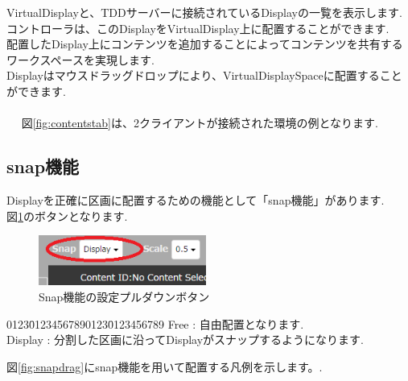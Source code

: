 \documentclass[a4paper,10pt,oneside]{jsbook}
\begin{document}
VirtualDisplayと、TDDサーバーに接続されているDisplayの一覧を表示します.\\
コントローラは、このDisplayをVirtualDisplay上に配置することができます.\\

配置したDisplay上にコンテンツを追加することによってコンテンツを共有するワークスペースを実現します.\\
Displayはマウスドラッグドロップにより、VirtualDisplaySpaceに配置することができます.\\
\\　
図\ref{fig:contentstab}は、2クライアントが接続された環境の例となります.


\clearpage 



\subsection{snap機能}
Displayを正確に区画に配置するための機能として「snap機能」があります.\\
図\ref{fig:snapdisp}のボタンとなります.\\

\begin{figure}[htbp]
	\begin{center}
		\includegraphics[width=5.5cm]{image/MIGIUE_Disp.PNG}
	\end{center}
	\caption{Snap機能の設定プルダウンボタン}
	\label{fig:snapdisp}
\end{figure}


\begin{tabbing}
0123\=01234567890123\=0123456789\kill
\>Free    \> : 自由配置となります.\\
\>Display \> : 分割した区画に沿ってDisplayがスナップするようになります.
\end{tabbing}

図\ref{fig:snapdrag}にsnap機能を用いて配置する凡例を示します。.\\
\end{document}

